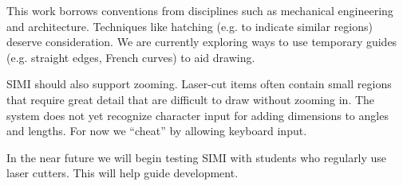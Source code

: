 \documentclass{chi-ext}
\begin{document}
This work borrows conventions from disciplines such as mechanical
engineering and architecture. Techniques like hatching (e.g. to
indicate similar regions) deserve consideration. We are currently
exploring ways to use temporary guides (e.g. straight edges, French
curves) to aid drawing.

SIMI should also support zooming. Laser-cut items often contain small
regions that require great detail that are difficult to draw without
zooming in. The system does not yet recognize character input for
adding dimensions to angles and lengths. For now we ``cheat'' by
allowing keyboard input.

In the near future we will begin testing SIMI with students who
regularly use laser cutters. This will help guide development.

\balance


\end{document}
